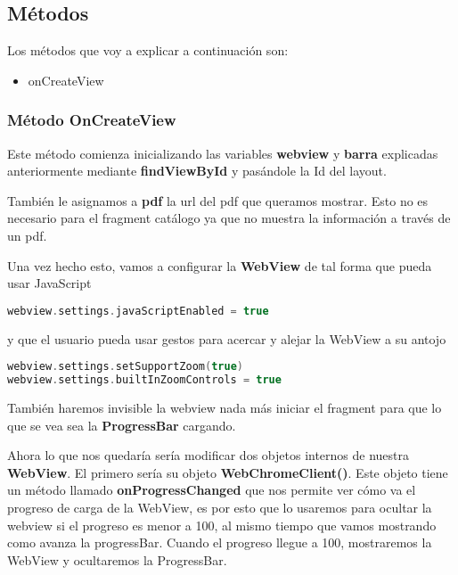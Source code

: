 \newpage

\subsection{Métodos}

Los métodos que voy a explicar a continuación son:

\begin{itemize}
\item{onCreateView}
\end{itemize}

\subsubsection{Método OnCreateView}

Este método comienza inicializando las variables \textbf{webview} y \textbf{barra} explicadas anteriormente mediante \textbf{findViewById} y pasándole la Id del layout.

También le asignamos a \textbf{pdf} la url del pdf que queramos mostrar. Esto no es necesario para el fragment catálogo ya que no muestra la información a través de un pdf.

Una vez hecho esto, vamos a configurar la \textbf{WebView} de tal forma que pueda usar JavaScript

\begin{lstlisting}[language=Kotlin]
webview.settings.javaScriptEnabled = true
\end{lstlisting}

y que el usuario pueda usar gestos para acercar y alejar la WebView a su antojo

\begin{lstlisting}[language=Kotlin]
webview.settings.setSupportZoom(true)
webview.settings.builtInZoomControls = true
\end{lstlisting}

También haremos invisible la webview nada más iniciar el fragment para que lo que se vea sea la \textbf{ProgressBar} cargando.

Ahora lo que nos quedaría sería modificar dos objetos internos de nuestra \textbf{WebView}. El primero sería su objeto \textbf{WebChromeClient()}. Este objeto tiene un método llamado \textbf{onProgressChanged} que nos permite ver cómo va el progreso de carga de la WebView, es por esto que lo usaremos para ocultar la webview si el progreso es menor a 100, al mismo tiempo que vamos mostrando como avanza la progressBar. Cuando el progreso llegue a 100, mostraremos la WebView y ocultaremos la ProgressBar.

